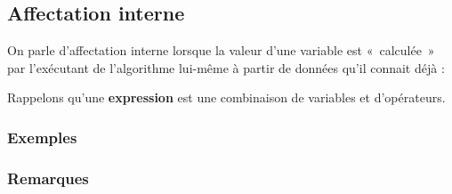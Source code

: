 		\subsection{Affectation interne }

			On parle d’affectation interne lorsque la valeur d’une variable est
			«~calculée~» par l’exécutant de l’algorithme lui-même à partir de
			données qu’il connait déjà :

			
			Rappelons qu’une \textbf{expression} 
			est une combinaison de variables et
			d’opérateurs.
			
			\subsubsection*{Exemples}
			

			\subsubsection*{Remarques}

